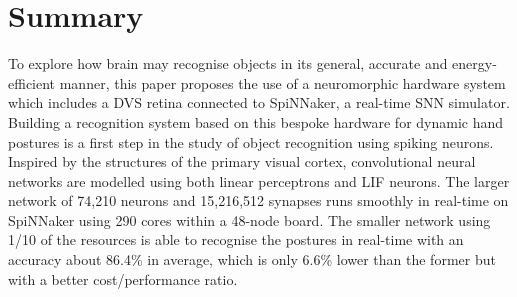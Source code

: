 \section{Summary}
\label{sec:cfw}

To explore how brain may recognise objects in its general, accurate and energy-efficient manner, this paper proposes the use of a neuromorphic hardware system which includes a DVS retina connected to SpiNNaker, a real-time SNN simulator.
Building a recognition system based on this bespoke hardware for dynamic hand postures is a first step in the study of object recognition using spiking neurons.
Inspired by the structures of the primary visual cortex, convolutional neural networks are modelled using both linear perceptrons and LIF neurons.
The larger network of 74,210 neurons and 15,216,512 synapses runs smoothly in real-time on SpiNNaker using 290 cores within a 48-node board.
The smaller network using 1/10 of the resources is able to recognise the postures in real-time with an accuracy about 86.4\% in average, which is 
only 6.6\% lower than the former but with a better cost/performance ratio.